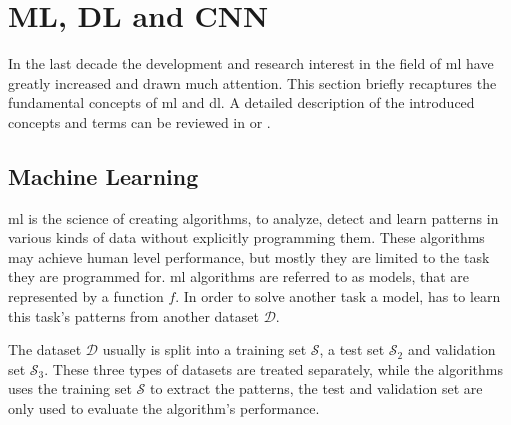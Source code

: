 
\section{ML, DL and CNN}\label{ord:ch2:sec1}

In the last decade the development and research interest in the field of \gls{ml} have greatly increased and drawn much attention. 
This section briefly recaptures the fundamental concepts of \gls{ml} and \gls{dl}.
A detailed description of the introduced concepts and terms can be reviewed in \cite{Ger17-HandsOn} or \cite{Goodfellow-et-al-2016}.


\subsection{Machine Learning}\label{ord:ch2:sec1:subsec1}

\gls{ml} is the science of creating algorithms, to analyze, detect and learn patterns in various kinds of data without explicitly programming them.
These algorithms may achieve human level performance, but mostly they are limited to the task they are programmed for.
\gls{ml} algorithms are referred to as models, that are represented by a function $f$. 
In order to solve another task a model, has to learn this task's patterns from another dataset $\mathcal{D}$.

The dataset $\mathcal{D}$ usually is split into a training set $\mathcal{S}$, a test set $\mathcal{S}_2$ and validation set $\mathcal{S}_3$.
These three types of datasets are treated separately, while the algorithms uses the training set $\mathcal{S}$ to extract the patterns, the test and validation set are only used to evaluate the algorithm's performance.

